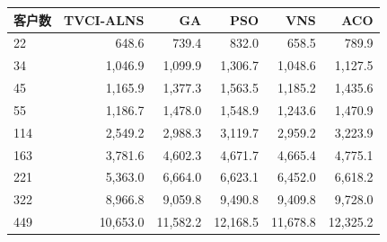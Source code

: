 \begin{tabular*}{0.92\linewidth}{@{\extracolsep{\fill}}lrrrrr@{}}
\toprule
客户数 & TVCI-ALNS & GA & PSO & VNS & ACO \\
\midrule
22 & 648.6 & 739.4 & 832.0 & 658.5 & 789.9 \\
34 & 1,046.9 & 1,099.9 & 1,306.7 & 1,048.6 & 1,127.5 \\
45 & 1,165.9 & 1,377.3 & 1,563.5 & 1,185.2 & 1,435.6 \\
55 & 1,186.7 & 1,478.0 & 1,548.9 & 1,243.6 & 1,470.9 \\
114 & 2,549.2 & 2,988.3 & 3,119.7 & 2,959.2 & 3,223.9 \\
163 & 3,781.6 & 4,602.3 & 4,671.7 & 4,665.4 & 4,775.1 \\
221 & 5,363.0 & 6,664.0 & 6,623.1 & 6,452.0 & 6,618.2 \\
322 & 8,966.8 & 9,059.8 & 9,490.8 & 9,409.8 & 9,728.0 \\
449 & 10,653.0 & 11,582.2 & 12,168.5 & 11,678.8 & 12,325.2 \\
\bottomrule
\end{tabular*}
